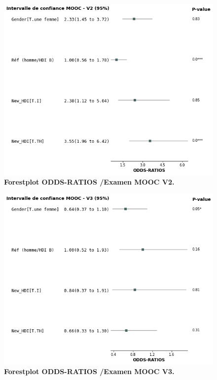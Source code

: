 \documentclass[12pt, a4paper, titlepage, table]{article}
\begin{document}
\begin{figure}[H]
	\centering
	\includegraphics[width=1\textwidth]{../../graph/forestplot_v2.png}
	\caption{\textbf{Forestplot ODDS-RATIOS /Examen MOOC V2.}}
\end{figure}

\begin{figure}[H]
	\centering
	\includegraphics[width=1\textwidth]{../../graph/forestplot_v3.png}
	\caption{\textbf{Forestplot ODDS-RATIOS /Examen MOOC V3.}}
\end{figure}
\end{document}
